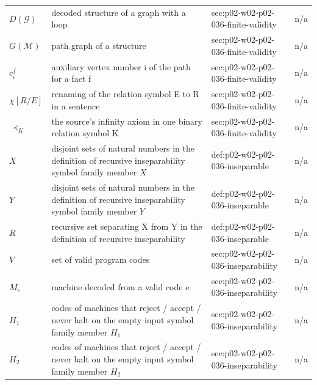 \begin{longtable}{@{}p{}p{}p{}p{}@{}}
\(D(\mathcal G)\) & decoded structure of a graph with a loop & sec:\allowbreak{}p02-\allowbreak{}w02-\allowbreak{}p02-\allowbreak{}036-\allowbreak{}finite-\allowbreak{}validity & n/a \\
\(G(\mathcal M)\) & path graph of a structure & sec:\allowbreak{}p02-\allowbreak{}w02-\allowbreak{}p02-\allowbreak{}036-\allowbreak{}finite-\allowbreak{}validity & n/a \\
\(c^f_i\) & auxiliary vertex number i of the path for a fact f & sec:\allowbreak{}p02-\allowbreak{}w02-\allowbreak{}p02-\allowbreak{}036-\allowbreak{}finite-\allowbreak{}validity & n/a \\
\(\chi[R/E]\) & renaming of the relation symbol E to R in a sentence & sec:\allowbreak{}p02-\allowbreak{}w02-\allowbreak{}p02-\allowbreak{}036-\allowbreak{}finite-\allowbreak{}validity & n/a \\
\(\prec_K\) & the source's infinity axiom in one binary relation symbol K & sec:\allowbreak{}p02-\allowbreak{}w02-\allowbreak{}p02-\allowbreak{}036-\allowbreak{}finite-\allowbreak{}validity & n/a \\
\(X\) & disjoint sets of natural numbers in the definition of recursive inseparability symbol family member \(X\) & def:\allowbreak{}p02-\allowbreak{}w02-\allowbreak{}p02-\allowbreak{}036-\allowbreak{}inseparable & n/a \\
\(Y\) & disjoint sets of natural numbers in the definition of recursive inseparability symbol family member \(Y\) & def:\allowbreak{}p02-\allowbreak{}w02-\allowbreak{}p02-\allowbreak{}036-\allowbreak{}inseparable & n/a \\
\(R\) & recursive set separating X from Y in the definition of recursive inseparability & def:\allowbreak{}p02-\allowbreak{}w02-\allowbreak{}p02-\allowbreak{}036-\allowbreak{}inseparable & n/a \\
\(V\) & set of valid program codes & sec:\allowbreak{}p02-\allowbreak{}w02-\allowbreak{}p02-\allowbreak{}036-\allowbreak{}inseparability & n/a \\
\(M_e\) & machine decoded from a valid code e & sec:\allowbreak{}p02-\allowbreak{}w02-\allowbreak{}p02-\allowbreak{}036-\allowbreak{}inseparability & n/a \\
\(H_1\) & codes of machines that reject / accept / never halt on the empty input symbol family member \(H_1\) & sec:\allowbreak{}p02-\allowbreak{}w02-\allowbreak{}p02-\allowbreak{}036-\allowbreak{}inseparability & n/a \\
\(H_2\) & codes of machines that reject / accept / never halt on the empty input symbol family member \(H_2\) & sec:\allowbreak{}p02-\allowbreak{}w02-\allowbreak{}p02-\allowbreak{}036-\allowbreak{}inseparability & n/a \\

\end{longtable}
